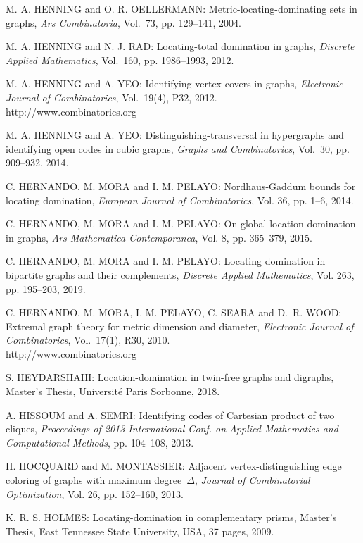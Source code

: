 \begin{thebibliography}{999}
M. A. HENNING and O. R. OELLERMANN: Metric-locating-dominating sets in graphs, {\it Ars Combinatoria}, Vol.~73, pp. 129--141, 2004.

M. A. HENNING and N. J. RAD: Locating-total domination in graphs, {\it Discrete Applied Mathematics}, Vol.~160, pp. 1986--1993, 2012.

M. A. HENNING and A. YEO: Identifying vertex covers in graphs, {\it Electronic Journal of Combinatorics}, Vol.~19(4), P32, 2012.\\
http://www.combinatorics.org

M. A. HENNING and A. YEO: Distinguishing-transversal in hypergraphs and identifying open codes in cubic graphs, {\it Graphs and Combinatorics}, Vol.~30, pp. 909--932, 2014.

C. HERNANDO, M. MORA and I. M. PELAYO: Nordhaus-Gaddum bounds for locating domination, {\it European Journal of Combinatorics}, Vol. 36, pp. 1--6, 2014. 

C. HERNANDO, M. MORA and I. M. PELAYO: On global location-domination in graphs, {\it Ars Mathematica Contemporanea}, Vol. 8, pp. 365--379, 2015.

C. HERNANDO, M. MORA and I. M. PELAYO: Locating domination in bipartite graphs and their complements, {\it Discrete Applied Mathematics}, Vol. 263, pp. 195--203, 2019.

C. HERNANDO, M. MORA, I. M. PELAYO, C. SEARA and D.~R. WOOD: Extremal graph theory for metric dimension and diameter, {\it Electronic Journal of Combinatorics}, Vol.~17(1), R30, 2010.\\
http://www.combinatorics.org

S. HEYDARSHAHI: Location-domination in twin-free graphs and digraphs, Master's Thesis, Universit\'e Paris Sorbonne, 2018.

A. HISSOUM and A. SEMRI: Identifying codes of Cartesian product of two cliques, {\it Proceedings of 2013 International Conf. on Applied Mathematics and Computational Methods}, pp. 104--108, 2013.

H. HOCQUARD and M. MONTASSIER: Adjacent vertex-distinguishing edge coloring of graphs with maximum degree~$\Delta$, {\it Journal of Combinatorial Optimization}, Vol. 26, pp. 152--160, 2013.

K. R. S. HOLMES: Locating-domination in complementary prisms, Master's Thesis, East Tennessee State University, USA, 37 pages, 2009.


\end{thebibliography}
